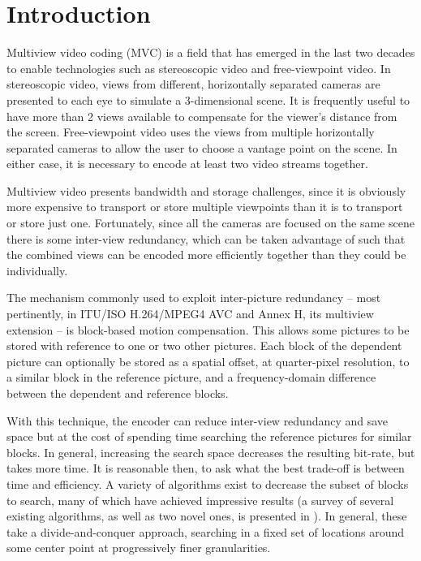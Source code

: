 \documentclass{sig-alternate-05-2015}
\begin{document}
\section{Introduction} %
\label{sec:introduction} %
Multiview video coding (MVC) is a field that has emerged in the last two decades
to enable technologies such as stereoscopic video and free-viewpoint video. In
stereoscopic video, views from different, horizontally separated cameras are
presented to each eye to simulate a 3-dimensional scene. It is frequently useful
to have more than 2 views available to compensate for the viewer's distance from
the screen. Free-viewpoint video uses the views from multiple horizontally
separated cameras to allow the user to choose a vantage point on the scene. In
either case, it is necessary to encode at least two video streams together.

Multiview video presents bandwidth and storage challenges, since it is obviously
more expensive to transport or store multiple viewpoints than it is to transport
or store just one. Fortunately, since all the cameras are focused on the same
scene there is some inter-view redundancy, which can be taken advantage of such
that the combined views can be encoded more efficiently together than they could
be individually.

The mechanism commonly used to exploit inter-picture redundancy -- most
pertinently, in ITU/ISO H.264/MPEG4 AVC and Annex H, its multiview extension
-- is block-based motion compensation. This allows some pictures to be stored
with reference to one or two other pictures. Each block of the dependent
picture can optionally be stored as a spatial offset, at quarter-pixel
resolution, to a similar block in the reference picture, and a frequency-domain
difference between the dependent and reference blocks.

With this technique, the encoder can reduce inter-view redundancy and save
space but at the cost of spending time searching the reference pictures for
similar blocks. In general, increasing the search space decreases the resulting
bit-rate, but takes more time. It is reasonable then, to ask what the best
trade-off is between time and efficiency. A variety of algorithms exist to
decrease the subset of blocks to search, many of which have achieved
impressive results (a survey of several existing algorithms, as well as two
novel ones, is presented in \cite{khattak:fast}). In general, these take a
divide-and-conquer approach, searching in a fixed set of locations around
some center point at progressively finer granularities.
\end{document}
